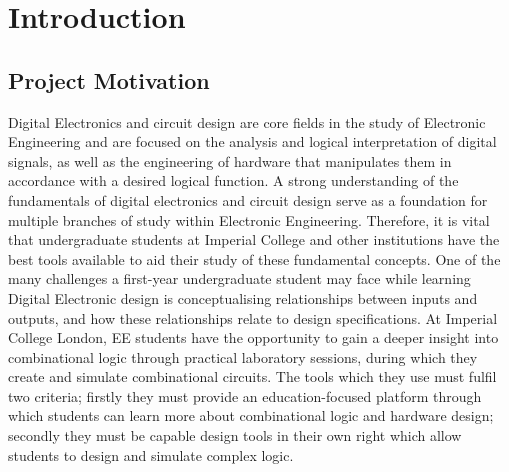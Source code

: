 \clearpage
{}

\chapter{Introduction} \label{chap:intro}

\section{Project Motivation}

Digital Electronics and circuit design are core fields in the study of Electronic Engineering and are focused on the analysis and logical interpretation of digital signals, as well as the engineering of hardware that manipulates them in accordance with a desired logical function. A strong understanding of the fundamentals of digital electronics and circuit design serve as a foundation for multiple branches of study within Electronic Engineering. Therefore, it is vital that undergraduate students at Imperial College and other institutions have the best tools available to aid their study of these fundamental concepts.
One of the many challenges a first-year undergraduate student may face while learning Digital Electronic design is conceptualising relationships between inputs and outputs, and how these relationships relate to design specifications. At Imperial College London, EE students have the opportunity to gain a deeper insight into combinational logic through practical laboratory sessions, during which they create and simulate combinational circuits. The tools which they use must fulfil two criteria; firstly they must provide an education-focused platform through which students can learn more about combinational logic and hardware design; secondly they must be capable design tools in their own right which allow students to design and simulate complex logic.

